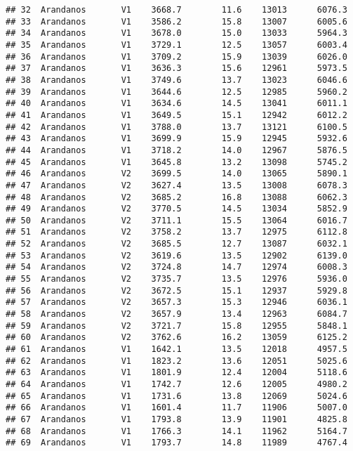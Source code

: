 \documentclass[]{book}
\begin{document}
\begin{verbatim}
## 32  Arandanos       V1    3668.7        11.6    13013      6076.3
## 33  Arandanos       V1    3586.2        15.8    13007      6005.6
## 34  Arandanos       V1    3678.0        15.0    13033      5964.3
## 35  Arandanos       V1    3729.1        12.5    13057      6003.4
## 36  Arandanos       V1    3709.2        15.9    13039      6026.0
## 37  Arandanos       V1    3636.3        15.6    12961      5973.5
## 38  Arandanos       V1    3749.6        13.7    13023      6046.6
## 39  Arandanos       V1    3644.6        12.5    12985      5960.2
## 40  Arandanos       V1    3634.6        14.5    13041      6011.1
## 41  Arandanos       V1    3649.5        15.1    12942      6012.2
## 42  Arandanos       V1    3788.0        13.7    13121      6100.5
## 43  Arandanos       V1    3699.9        15.9    12945      5932.6
## 44  Arandanos       V1    3718.2        14.0    12967      5876.5
## 45  Arandanos       V1    3645.8        13.2    13098      5745.2
## 46  Arandanos       V2    3699.5        14.0    13065      5890.1
## 47  Arandanos       V2    3627.4        13.5    13008      6078.3
## 48  Arandanos       V2    3685.2        16.8    13088      6062.3
## 49  Arandanos       V2    3770.5        14.5    13034      5852.9
## 50  Arandanos       V2    3711.1        15.5    13064      6016.7
## 51  Arandanos       V2    3758.2        13.7    12975      6112.8
## 52  Arandanos       V2    3685.5        12.7    13087      6032.1
## 53  Arandanos       V2    3619.6        13.5    12902      6139.0
## 54  Arandanos       V2    3724.8        14.7    12974      6008.3
## 55  Arandanos       V2    3735.7        13.5    12976      5936.0
## 56  Arandanos       V2    3672.5        15.1    12937      5929.8
## 57  Arandanos       V2    3657.3        15.3    12946      6036.1
## 58  Arandanos       V2    3657.9        13.4    12963      6084.7
## 59  Arandanos       V2    3721.7        15.8    12955      5848.1
## 60  Arandanos       V2    3762.6        16.2    13059      6125.2
## 61  Arandanos       V1    1642.1        13.5    12018      4957.5
## 62  Arandanos       V1    1823.2        13.6    12051      5025.6
## 63  Arandanos       V1    1801.9        12.4    12004      5118.6
## 64  Arandanos       V1    1742.7        12.6    12005      4980.2
## 65  Arandanos       V1    1731.6        13.8    12069      5024.6
## 66  Arandanos       V1    1601.4        11.7    11906      5007.0
## 67  Arandanos       V1    1793.8        13.9    11901      4825.8
## 68  Arandanos       V1    1766.3        14.1    11962      5164.7
## 69  Arandanos       V1    1793.7        14.8    11989      4767.4

\end{verbatim}
\end{document}
